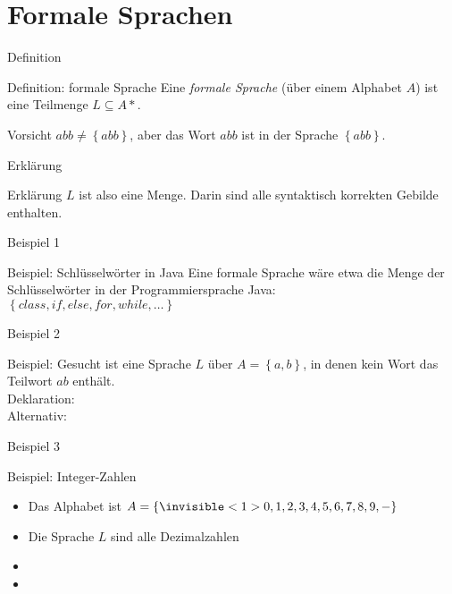 \section{Formale Sprachen}
\begin{frame}{Definition}
    \begin{block}{Definition: formale Sprache}
        Eine \emph{formale Sprache} (über einem Alphabet $A$) ist eine Teilmenge
$L \subseteq A*$.
    \end{block}
    \begin{alertblock}{Vorsicht}
        $abb \neq \left\{ abb\right\}$, aber das Wort $abb$ ist in der Sprache $\left\{ abb\right\}$.
    \end{alertblock}
\end{frame}
\begin{frame}{Erklärung}
    \begin{block}{Erklärung}
        $L$ ist also eine Menge. Darin sind alle syntaktisch korrekten Gebilde enthalten.
    \end{block}
\end{frame}
\begin{frame}{Beispiel 1}
    \begin{block}{Beispiel: Schlüsselwörter in Java}
        Eine formale Sprache wäre etwa die Menge der Schlüsselwörter in der Programmiersprache Java:\\
        $\left\{ class, if, else, for, while,\dots\right\}$
    \end{block}
\end{frame}
\begin{frame}{Beispiel 2}
    \begin{block}{Beispiel: }
        Gesucht ist eine Sprache $L$ über $A = \left\{ a, b\right\}$, in denen kein Wort das Teilwort $ab$ enthält.\\
        Deklaration: \\
        \pause
        Alternativ: 
        \pause
    \end{block}
\end{frame}
\begin{frame}{Beispiel 3}
    \begin{block}{Beispiel: Integer-Zahlen}
        \begin{itemize}
            \item Das Alphabet ist $A = \left\{\invisible<1>{ 0, 1, 2, 3, 4, 5, 6, 7, 8, 9, - }\right\}$
                \pause
            \item Die Sprache $L$ sind alle Dezimalzahlen
                \pause
            \item {}
                \pause
            \item {}
        \end{itemize}
    \end{block}
\end{frame}

